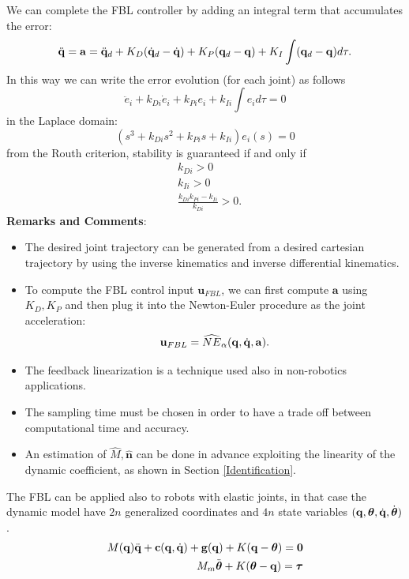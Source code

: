 \documentclass[10pt, a4paper]{report}
\newcommand{\q}{{\mathbf q}}
\begin{document}
\noindent We can complete the FBL controller by adding an integral term that accumulates the error:\begin{equation}
    \ddq=\mathbf a=\ddq_d+K_D(\dq_d-\dq)+K_P(\q_d-\q)+K_I\int (\q_d-\q)d\tau.
\end{equation}
In this way we can write the error evolution (for each joint) as follows\begin{equation}
    \ddot e_i+k_{Di}\dot e_i+k_{Pi}e_i+k_{Ii}\int e_id\tau=0
\end{equation}
in the Laplace domain:
\begin{equation}
    (s^3+k_{Di}s^2+k_{Pi}s+k_{Ii})e_i(s)=0 
\end{equation}
from the Routh criterion, stability is guaranteed if and only if\begin{align}
    &k_{Di}>0\\ 
    &k_{Ii}>0\\ 
    &\frac{k_{Di}k_{Pi}-k_{Ii}}{k_{Di}}>0.
\end{align}
\noindent\textbf{Remarks and Comments}:\begin{itemize}
    \item The desired joint trajectory can be generated from a desired cartesian trajectory by using the inverse kinematics and inverse differential kinematics.
    \item To compute the FBL control input $\mathbf u_{FBL}$, we can first compute $\mathbf a$ using $K_D,K_P$ and then plug it into the Newton-Euler procedure as the joint acceleration:\begin{equation}
        \mathbf u_{FBL}=\widehat{NE}_\alpha(\q,\dq,\mathbf a).
    \end{equation}
    \item The feedback linearization is a technique used also in non-robotics applications.
    \item The sampling time must be chosen in order to have a trade off between computational time and accuracy. 
    \item An estimation of $\hat M,\hat{\mathbf n}$ can be done in advance exploiting the linearity of the dynamic coefficient, as shown in Section \ref{Identification}.
\end{itemize}
The FBL can be applied also to robots with elastic joints, in that case the dynamic model have $2n$ generalized coordinates and $4n$ state variables $(\q,\btheta,\dq,\dot\btheta)$.\begin{align}
    M(\q)\ddq+\mathbf c(\q,\dq)+\mathbf g(\q)+K(\q-\btheta)=\mathbf 0&\\
    M_m\ddot{\btheta}+K(\btheta-\q)=\btau&
\end{align}
\end{document}
